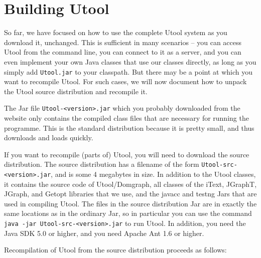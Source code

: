\section{Building Utool} \label{sec:building}

So far, we have focused on how to use the complete Utool system as you
download it, unchanged. This is sufficient in many scenarios -- you
can access Utool from the command line, you can connect to it as a
server, and you can even implement your own Java classes that use our
classes directly, as long as you simply add \verb?Utool.jar? to your
classpath. But there may be a point at which you want to recompile
Utool. For such cases, we will now document how to unpack the Utool
source distribution and recompile it.

The Jar file \verb?Utool-<version>.jar? which you probably downloaded
from the website only contains the compiled class files that are
necessary for running the programme. This is the standard distribution
because it is pretty small, and thus downloads and loads quickly.

If you want to recompile (parts of) Utool, you will need to download
the source distribution. The source distribution has a filename of the
form \verb?Utool-src-<version>.jar?, and is some 4 megabytes in
size. In addition to the Utool classes, it contains the source code of
Utool/Domgraph, all classes of the iText, JGraphT, JGraph, and Getopt
libraries that we use, and the javacc and testng Jars that are used in
compiling Utool. The files in the source distribution Jar are in
exactly the same locations as in the ordinary Jar, so in particular
you can use the command \verb?java -jar Utool-src-<version>.jar? to
run Utool. In addition, you need the Java SDK 5.0 or higher, and you
need Apache Ant 1.6 or higher.

Recompilation of Utool from the source distribution proceeds as
follows:

